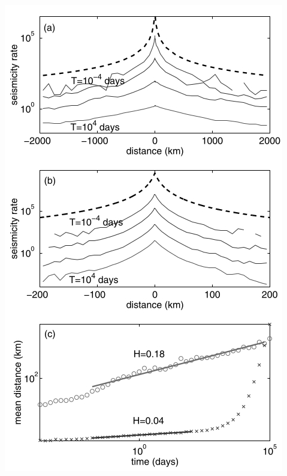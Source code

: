 \documentclass[aspectratio=43,9pt]{beamer}
\begin{document}
\begin{frame}
 {}
 
 \begin{minipage}{0.48\linewidth}
   \includegraphics[width=1\linewidth]{Figs/fig9}
 \end{minipage}
 \begin{minipage}{0.48\linewidth}

 \end{minipage}

 
\end{frame}
\end{document}
